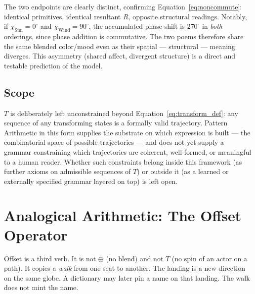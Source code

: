 \documentclass[12pt, a4paper]{article}
\begin{document}
The two endpoints are clearly distinct, confirming
Equation~\eqref{eq:noncommute}: identical primitives, identical
resultant $R$, opposite structural readings. Notably, if $\chi_{\text{Sun}}
= 0^\circ$ and $\chi_{\text{Wind}} = 90^\circ$, the accumulated phase
shift is $270^\circ$ in \emph{both} orderings, since phase addition is
commutative. The two poems therefore share the same blended color/mood
even as their spatial --- structural --- meaning diverges. This
asymmetry (shared affect, divergent structure) is a direct and
testable prediction of the model.

\subsection{Scope}
\label{subsec:transform_scope}
$T$ is deliberately left unconstrained beyond
Equation~\eqref{eq:transform_def}: any sequence of any transforming
states is a formally valid trajectory. Pattern Arithmetic in this form
supplies the substrate on which expression is built --- the
combinatorial space of possible trajectories --- and does not yet
supply a grammar constraining which trajectories are coherent,
well-formed, or meaningful to a human reader. Whether such constraints
belong inside this framework (as further axioms on admissible
sequences of $T$) or outside it (as a learned or externally specified
grammar layered on top) is left open.

\section{Analogical Arithmetic: The Offset Operator}
\label{sec:analogical_offset}

Offset is a third verb. It is not $\oplus$ (no blend) and not $T$
(no spin of an actor on a path). It copies a \emph{walk} from one
seat to another. The landing is a new direction on the same globe.
A dictionary may later pin a name on that landing. The walk does
not mint the name.
\end{document}
